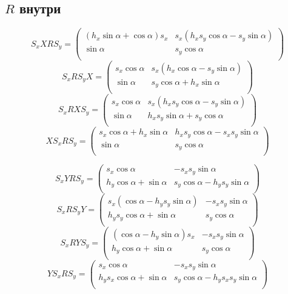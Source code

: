 \subsection{$R$ внутри}

$$S_xXRS_y = \begin{pmatrix} \left( h_x \sin\alpha + \cos\alpha \right) s_x & s_x \left( h_x s_y \cos\alpha - s_y \sin\alpha \right) \\ \sin\alpha & s_y \cos\alpha \\ \end{pmatrix} $$
$$S_xRS_yX = \begin{pmatrix} s_x \cos\alpha & s_x \left( h_x \cos\alpha - s_y \sin\alpha \right) \\ \sin\alpha & s_y \cos\alpha + h_x \sin\alpha \\ \end{pmatrix} $$
$$S_xRXS_y = \begin{pmatrix} s_x \cos\alpha & s_x \left( h_x s_y \cos\alpha - s_y \sin\alpha \right) \\ \sin\alpha & h_x s_y \sin\alpha + s_y \cos\alpha \\ \end{pmatrix} $$
$$XS_xRS_y = \begin{pmatrix} s_x \cos\alpha + h_x \sin\alpha & h_x s_y \cos\alpha - s_x s_y \sin\alpha \\ \sin\alpha & s_y \cos\alpha \\ \end{pmatrix} $$

$$S_xYRS_y = \begin{pmatrix} s_x \cos\alpha & - s_x s_y \sin\alpha \\ h_y \cos\alpha + \sin\alpha & s_y \cos\alpha - h_y s_y \sin\alpha \\ \end{pmatrix} $$
$$S_xRS_yY = \begin{pmatrix} s_x \left( \cos\alpha - h_y s_y \sin\alpha \right) & - s_x s_y \sin\alpha \\ h_y s_y \cos\alpha + \sin\alpha & s_y \cos\alpha \\ \end{pmatrix} $$
$$S_xRYS_y = \begin{pmatrix} \left( \cos\alpha - h_y \sin\alpha \right) s_x & - s_x s_y \sin\alpha \\ h_y \cos\alpha + \sin\alpha & s_y \cos\alpha \\ \end{pmatrix} $$
$$YS_xRS_y = \begin{pmatrix} s_x \cos\alpha & - s_x s_y \sin\alpha \\ h_y s_x \cos\alpha + \sin\alpha & s_y \cos\alpha - h_y s_x s_y \sin\alpha \\ \end{pmatrix} $$

